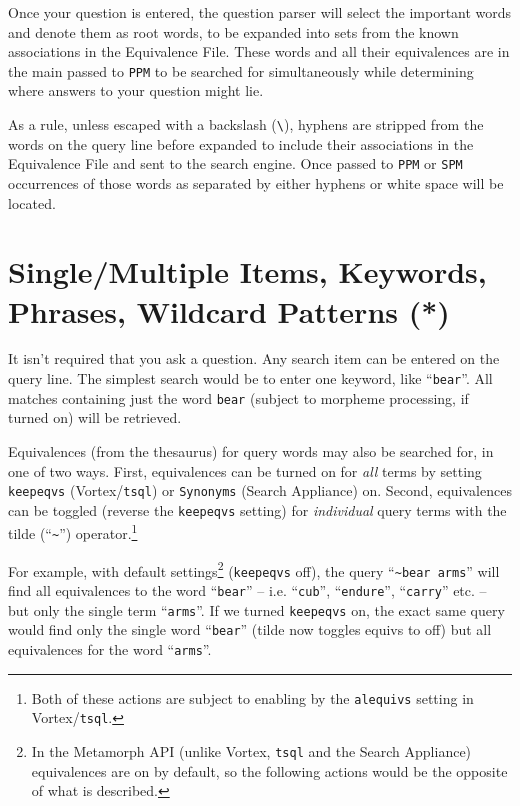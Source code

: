 Once your question is entered, the question parser will select the
important words and denote them as root words, to be expanded into
sets from the known associations in the Equivalence File.  These words
and all their equivalences are in the main passed to \verb`PPM` to be
searched for simultaneously while determining where answers to your
question might lie.

As a rule, unless escaped with a backslash (\verb`\`), hyphens are
stripped from the words on the query line before expanded to include
their associations in the Equivalence File and sent to the search
engine.  Once passed to \verb`PPM` or \verb`SPM` occurrences of those
words as separated by either hyphens or white space will be located.


\section{Single/Multiple Items, Keywords, Phrases, Wildcard Patterns (*)}

It isn't required that you ask a question.  Any search item can be
entered on the query line.  The simplest search would be to enter one
keyword, like ``\verb`bear`''.  All matches containing just the word
\verb`bear` (subject to morpheme processing, if turned on) will
be retrieved.

Equivalences (from the thesaurus) for query words may also be searched
for, in one of two ways.  First, equivalences can be turned on for {\em
all} terms by setting \verb`keepeqvs` (Vortex/\verb`tsql`) or
\verb`Synonyms` (Search Appliance) on.  Second, equivalences can be
toggled (reverse the \verb`keepeqvs` setting) for {\em individual}
query terms with the tilde (``\verb`~`'') operator.\footnote{Both of
these actions are subject to enabling by the \verb`alequivs` setting
in Vortex/\verb`tsql`.}

For example, with default settings\footnote{In the Metamorph API
(unlike Vortex, \verb`tsql` and the Search Appliance) equivalences are
on by default, so the following actions would be the opposite of what
is described.} (\verb`keepeqvs` off), the query ``\verb`~bear arms`''
will find all equivalences to the word ``\verb`bear`'' -- i.e.
``\verb`cub`'', ``\verb`endure`'', ``\verb`carry`'' etc. -- but only
the single term ``\verb`arms`''.  If we turned \verb`keepeqvs` on, the
exact same query would find only the single word ``\verb`bear`''
(tilde now toggles equivs to off) but all equivalences for the word
``\verb`arms`''.

